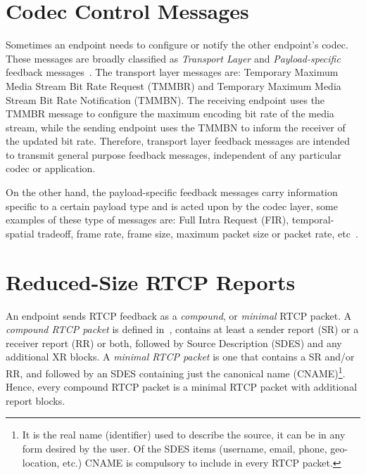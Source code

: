

\section{Codec Control Messages}

Sometimes an endpoint needs to configure or notify the other endpoint's codec.
These messages are broadly classified as \emph{Transport Layer} and \emph
{Payload-specific} feedback messages~\cite{rfc4585, rfc5104}. The transport
layer messages are: Temporary Maximum Media Stream Bit Rate Request (TMMBR)
and Temporary Maximum Media Stream Bit Rate Notification (TMMBN). The
receiving endpoint uses the TMMBR message to configure the maximum encoding
bit rate of the media stream, while the sending endpoint uses the TMMBN to
inform the receiver of the updated bit rate. Therefore, transport layer
feedback messages are intended to transmit general purpose feedback messages,
independent of any particular codec or application.

On the other hand, the payload-specific feedback messages carry information
specific to a certain payload type and is acted upon by the codec layer, some
examples of these type of messages are: Full Intra Request (FIR), temporal-
spatial tradeoff, frame rate, frame size, maximum packet size or packet rate,
etc~\cite{draft.avt.cop}.

\section{Reduced-Size RTCP Reports}

An endpoint sends RTCP feedback as a \emph{compound}, or \emph{minimal} RTCP
packet. A \emph{compound RTCP packet} is defined in~\cite{rfc3585}, contains
at least a sender report (SR) or a receiver report (RR) or both, followed by
Source Description (SDES) and any additional XR blocks. A \emph{minimal RTCP
packet} is one that contains a SR and/or RR, and followed by an SDES
containing just the canonical name (CNAME)\footnote{It is the real name
(identifier) used to describe the source, it can be in any form desired by the
user. Of the SDES items (username, email, phone, geo-location, etc.) CNAME is
compulsory to include in every RTCP packet.}. Hence, every compound RTCP
packet is a minimal RTCP packet with additional report blocks.

